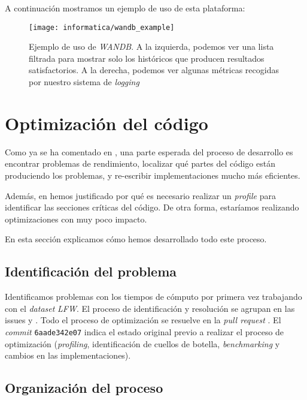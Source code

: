 A continuación mostramos un ejemplo de uso de esta plataforma:

\begin{figure}[H]
    \centering
    \texttt{[image: informatica/wandb\_example]}
    \caption{Ejemplo de uso de \textit{WANDB}. A la izquierda, podemos ver una lista filtrada para mostrar solo los históricos que producen resultados satisfactorios. A la derecha, podemos ver algunas métricas recogidas por nuestro sistema de \textit{logging}}
\end{figure}

\section{Optimización del código} \label{isec:optimizacion_codigo}

Como ya se ha comentado en , una parte esperada del proceso de desarrollo es encontrar problemas de rendimiento, localizar qué partes del código están produciendo los problemas, y re-escribir implementaciones mucho más eficientes.

Además, en  hemos justificado por qué es necesario realizar un \textit{profile} para identificar las secciones críticas del código. De otra forma, estaríamos realizando optimizaciones con muy poco impacto.

En esta sección explicamos cómo hemos desarrollado todo este proceso.

\subsection{Identificación del problema}

Identificamos problemas con los tiempos de cómputo por primera vez trabajando con el \textit{dataset} \textit{LFW}. El proceso de identificación y resolución se agrupan en las issues \cite{informatica:issue35_profiling} y \cite{informatica:issue36_slowmetrics}. Todo el proceso de optimización se resuelve en la \textit{pull request} \cite{informatica:pr42_profiling}. El \textit{commit} \lstinline{6aade342e07} \cite{informatica:commit_base_optimizacion} indica el estado original previo a realizar el proceso de optimización (\textit{profiling}, identificación de cuellos de botella, \textit{benchmarking} y cambios en las implementaciones).

\subsection{Organización del proceso}

